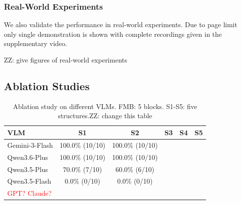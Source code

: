 \documentclass[letterpaper, 10 pt, conference]{ieeeconf}  %
\newcommand{\zz}[1]{{\color{red}ZZ: #1}}
\begin{document}

\subsubsection{Real-World Experiments}

We also validate the performance in real-world experiments. 
Due to page limit only single demonstration is shown with complete recordings given in the supplementary video. 


\zz{give figures of real-world experiments}

\subsection{Ablation Studies}


\begin{table}[t]
\footnotesize
\centering
\caption{Ablation study on different VLMs. FMB: 5 blocks. S1-S5: five structures.\zz{change this table} }
\label{tab:vlm_backbone_selection}
\begin{tabular}{lccccc}
\toprule
VLM & S1 & S2 & S3 & S4 & S5 \\
\midrule
Gemini-3-Flash & 100.0\% (10/10) & 100.0\% (10/10) \\
Qwen3.6-Plus   & 100.0\% (10/10) & 100.0\% (10/10) \\
Qwen3.5-Plus   & \phantom{0}70.0\% (7/10) & \phantom{0}60.0\% (6/10) \\
Qwen3.5-Flash  & \phantom{00}0.0\% (0/10) & \phantom{00}0.0\% (0/10) \\
\textcolor{red}{GPT? Claude?} \\
\bottomrule
\end{tabular}
\end{table}
\end{document}
